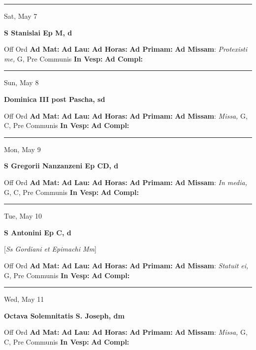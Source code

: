 \documentclass[letterpaper, 10pt]{article}
\begin{document}
\hrule
\begin{center}
Sat, May 7
\end{center}\textbf{ \large S Stanislai Ep M, \textnormal{\normalsize d}}
\begin{justify}
Off Ord
\textbf{Ad Mat: }
\textbf{Ad Lau: }
\textbf{Ad Horas: }
\textbf{Ad Primam: }
\textbf{Ad Missam}: \textit{Protexisti me,} G, Pre Communis
\textbf{In Vesp: }
\textbf{Ad Compl: }\end{justify}



\hrule
\begin{center}
Sun, May 8
\end{center}\textbf{ \large Dominica III post Pascha, \textnormal{\normalsize sd}}
\begin{justify}
Off Ord
\textbf{Ad Mat: }
\textbf{Ad Lau: }
\textbf{Ad Horas: }
\textbf{Ad Primam: }
\textbf{Ad Missam}: \textit{Missa,} G, C, Pre Communis
\textbf{In Vesp: }
\textbf{Ad Compl: }\end{justify}



\hrule
\begin{center}
Mon, May 9
\end{center}\textbf{ \large S Gregorii Nanzanzeni Ep CD, \textnormal{\normalsize d}}
\begin{justify}
Off Ord
\textbf{Ad Mat: }
\textbf{Ad Lau: }
\textbf{Ad Horas: }
\textbf{Ad Primam: }
\textbf{Ad Missam}: \textit{In media,} G, C, Pre Communis
\textbf{In Vesp: }
\textbf{Ad Compl: }\end{justify}



\hrule
\begin{center}
Tue, May 10
\end{center}\textbf{ \large S Antonini Ep C, \textnormal{\normalsize d}}

[\textit{Ss Gordiani et Epimachi Mm}]
\begin{justify}
Off Ord
\textbf{Ad Mat: }
\textbf{Ad Lau: }
\textbf{Ad Horas: }
\textbf{Ad Primam: }
\textbf{Ad Missam}: \textit{Statuit ei,} G, Pre Communis
\textbf{In Vesp: }
\textbf{Ad Compl: }\end{justify}



\hrule
\begin{center}
Wed, May 11
\end{center}\textbf{ \large Octava Solemnitatis S. Joseph, \textnormal{\normalsize dm}}
\begin{justify}
Off Ord
\textbf{Ad Mat: }
\textbf{Ad Lau: }
\textbf{Ad Horas: }
\textbf{Ad Primam: }
\textbf{Ad Missam}: \textit{Missa,} G, C, Pre Communis
\textbf{In Vesp: }
\textbf{Ad Compl: }\end{justify}
\end{document}
